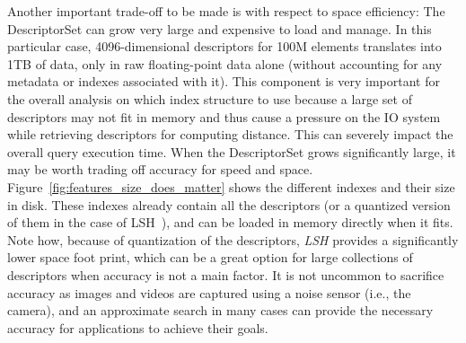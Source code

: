 Another important trade-off to be made is with respect to space efficiency:
The DescriptorSet can grow very large and expensive to load and manage.
In this particular case, 4096-dimensional descriptors for 100M elements
translates into 1TB of data, only in raw floating-point data alone
(without accounting for any metadata or indexes associated with it).
This component is very important for the overall analysis on which
index structure to use because a large set of descriptors may not fit in memory
and thus cause a pressure on the IO system while retrieving descriptors
for computing distance.
This can severely impact the overall query execution time.
When the DescriptorSet grows significantly large,
it may be worth trading off accuracy for speed and space.
Figure~\ref{fig:features_size_does_matter} shows the different indexes and
their size in disk. These indexes already contain all the descriptors (or
a quantized version of them in the case of LSH~\cite{lsh}),
and can be loaded in memory directly when it fits.
Note how, because of quantization of the descriptors, \textit{LSH} provides a
significantly lower space foot print, which can be a great option for
large collections of descriptors when accuracy is not a main factor.
It is not uncommon to sacrifice accuracy as images and videos are captured
using a noise sensor (i.e., the camera), and an approximate search
in many cases can provide the necessary accuracy for applications
to achieve their goals.
